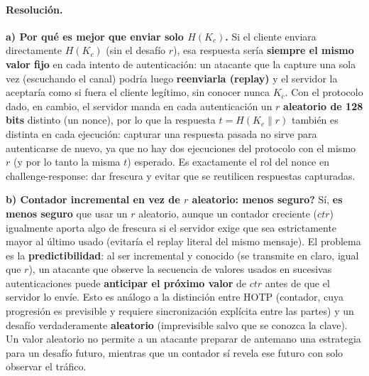 \paragraph{Resolución.}

\textbf{a) Por qué es mejor que enviar solo $H(K_c)$.}
Si el cliente enviara directamente $H(K_c)$ (sin el desafío $r$), esa respuesta
sería \textbf{siempre el mismo valor fijo} en cada intento de autenticación: un
atacante que la capture una sola vez (escuchando el canal) podría luego
\textbf{reenviarla (replay)} y el servidor la aceptaría como si fuera el cliente
legítimo, sin conocer nunca $K_c$. Con el protocolo dado, en cambio, el servidor
manda en cada autenticación un $r$ \textbf{aleatorio de 128 bits} distinto (un
nonce), por lo que la respuesta $t=H(K_c\|r)$ también es distinta en cada
ejecución: capturar una respuesta pasada no sirve para autenticarse de nuevo, ya
que no hay dos ejecuciones del protocolo con el mismo $r$ (y por lo tanto la misma
$t$) esperado. Es exactamente el rol del nonce en challenge-response: dar frescura
y evitar que se reutilicen respuestas capturadas.

\textbf{b) Contador incremental en vez de $r$ aleatorio: \textquestiondown{}menos seguro?}
Sí, \textbf{es menos seguro} que usar un $r$ aleatorio, aunque un contador
creciente ($ctr$) igualmente aporta algo de frescura si el servidor exige que sea
estrictamente mayor al último usado (evitaría el replay literal del mismo
mensaje). El problema es la \textbf{predictibilidad}: al ser incremental y
conocido (se transmite en claro, igual que $r$), un atacante que observe la
secuencia de valores usados en sucesivas autenticaciones puede \textbf{anticipar
el próximo valor} de $ctr$ antes de que el servidor lo envíe. Esto es análogo a la
distinción entre HOTP (contador, cuya progresión es previsible y requiere
sincronización explícita entre las partes) y un desafío verdaderamente
\textbf{aleatorio} (imprevisible salvo que se conozca la clave). Un valor
aleatorio no permite a un atacante preparar de antemano una estrategia para un
desafío futuro, mientras que un contador sí revela ese futuro con solo observar
el tráfico.

